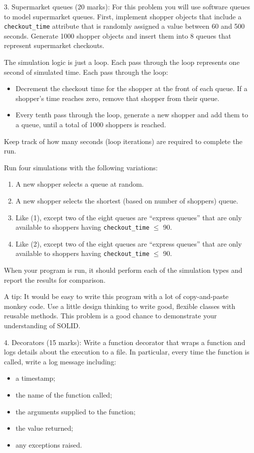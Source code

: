 \documentclass{article}
\begin{document}
\vspace{3mm}
3. Supermarket queues (20 marks): For this problem you will use software queues to model supermarket queues. First, implement shopper objects that include a \texttt{checkout\_time} attribute that is randomly assigned a value between 60 and 500 seconds. Generate 1000 shopper objects and insert them into 8 queues that represent supermarket checkouts.

The simulation logic is just a loop. Each pass through the loop represents one second of simulated time. Each pass through the loop:
\begin{itemize}
  \item Decrement the checkout time for the shopper at the front of each queue. If a shopper's time reaches zero, remove that shopper from their queue.
  \item Every tenth pass through the loop, generate a new shopper and add them to a queue, until a total of 1000 shoppers is reached.
\end{itemize}
Keep track of how many seconds (loop iterations) are required to complete the run.  

Run four simulations with the following variations:
\begin{enumerate}
  \item A new shopper selects a queue at random.
  \item A new shopper selects the shortest (based on number of shoppers) queue.
  \item Like (1), except two of the eight queues are ``express queues'' that are only available to shoppers having \texttt{checkout\_time} $\leq$ 90.
  \item Like (2), except two of the eight queues are ``express queues'' that are only available to shoppers having \texttt{checkout\_time} $\leq$ 90.
\end{enumerate}

When your program is run, it should perform each of the simulation types and report the results for comparison. 

A tip: It would be easy to write this program with a lot of copy-and-paste monkey code. Use a little design thinking to write good, flexible classes with reusable methods. This problem is a good chance to demonstrate your understanding of SOLID.
 
\vspace{3mm}
4. Decorators (15 marks): Write  a function decorator that wraps a function and logs details about the execution to a file. In particular, every time the function is called, write a log message including:
  \begin{itemize}
    \item a timestamp;
    \item the name of the function called;
    \item the arguments supplied to the function;
    \item the value returned;
    \item any exceptions raised.
  \end{itemize}
  
\end{document}
